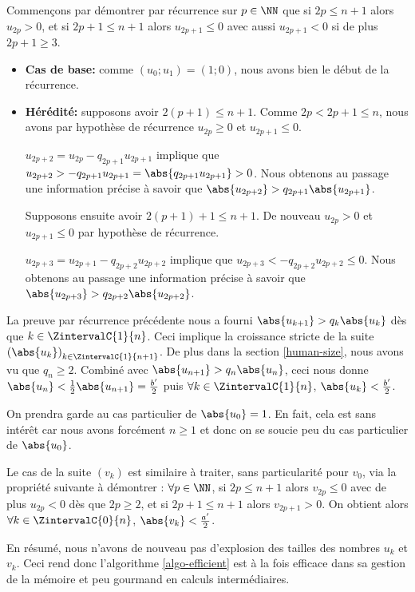 \medskip


Commençons par démontrer par récurrence sur $p \in \NN$ que si $2p \leq n+1$ alors $u_{2p} > 0$, et si $2p + 1 \leq n+1$ alors $u_{2p+1} \leq 0$ avec aussi $u_{2p+1} < 0$ si de plus $2p+1 \geq 3$.

\begin{itemize}[label = \small\textbullet]
	\item \textbf{Cas de base:} comme $(u_0 ; u_1) = (1 ; 0)$, nous avons bien le début de la récurrence.


	\item  \textbf{Hérédité:} supposons avoir $2(p+1) \leq n+1$. Comme $2p < 2p + 1 \leq n$, nous avons par hypothèse de récurrence $u_{2p} \geq 0$ et $u_{2p+1} \leq 0$.
	
	\noindent
	$u_{2p+2} = u_{2p} - q_{2p+1} u_{2p+1}$ implique que 
	$u_{2p+2} > - q_{2p+1} u_{2p+1} = \abs{q_{2p+1} u_{2p+1}} > 0$.
	Nous obtenons au passage une information précise à savoir que $\abs{u_{2p+2}} > q_{2p+1} \abs{u_{2p+1}}$.
	
	
	\medskip
	\noindent
	Supposons ensuite avoir $2(p+1) + 1 \leq n+1$. De nouveau $u_{2p} > 0$ et $u_{2p+1} \leq 0$ par hypothèse de récurrence.
	
	\noindent
	$u_{2p+3} = u_{2p+1} - q_{2p+2} u_{2p+2}$ implique que
	$u_{2p+3} < - q_{2p+2} u_{2p+2} \leq 0$.
	Nous obtenons au passage une information précise à savoir que $\abs{u_{2p+3}} > q_{2p+2} \abs{u_{2p+2}}$.
\end{itemize}


La preuve par récurrence précédente nous a fourni $\abs{u_{k+1}} > q_k \abs{u_k}$ dès que $k \in \ZintervalC{1}{n}$. Ceci implique la croissance stricte de la suite $\left( \abs{u_k} \right)_{k \in \ZintervalC{1}{n+1}}$.
De plus dans la section \ref{human-size}, nous avons vu que $q_n \geq 2$. Combiné avec $\abs{u_{n+1}} > q_n \abs{u_n}$, ceci nous donne $\abs{u_n} < \frac{1}{2} \abs{u_{n+1}} = \frac{b^\prime}{2}$ puis $\forall k \in \ZintervalC{1}{n}$, $\abs{u_k} < \frac{b^\prime}{2}$.


\medskip


On prendra garde au cas particulier de $\abs{u_0} = 1$. En fait, cela est sans intérêt car nous avons forcément $n \geq 1$ et donc on se soucie peu du cas particulier de $\abs{u_0}$. 


\medskip


Le cas de la suite $(v_k)$ est similaire à traiter, sans particularité pour $v_0$, via la propriété suivante à démontrer :
$\forall p \in \NN$, si $2p \leq n+1$ alors $v_{2p} \leq 0$ avec de plus $u_{2p} < 0$ dès que $2p \geq 2$, et si $2p + 1 \leq n+1$ alors $v_{2p+1} > 0$.
On obtient alors $\forall k \in \ZintervalC{0}{n}$, $\abs{v_k} < \frac{a^\prime}{2}$.


\medskip


En résumé, nous n'avons de nouveau pas d'explosion des tailles des nombres $u_k$ et $v_k$. Ceci rend donc l'algorithme \ref{algo-efficient} est à la fois efficace dans sa gestion de la mémoire et peu gourmand en calculs intermédiaires.